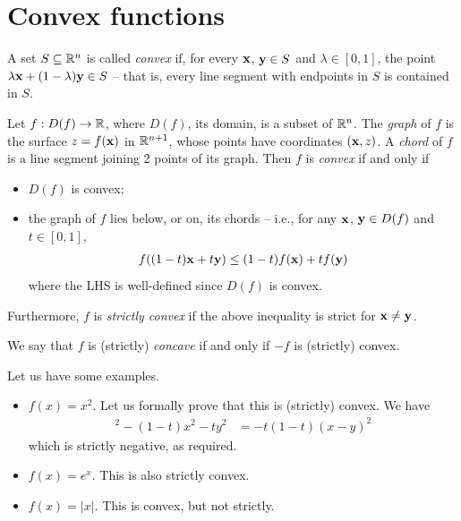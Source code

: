 \documentclass{../../template/note}
\begin{document}
    \section{Convex functions}
    
    \begin{definition}
        A set $S \subseteq \mathbb R^n$ is called \emph{convex} if, for every $\V x$, $\V y \in S$ and $\lambda \in [0, 1]$, the point $\lambda \V x + (1-\lambda)\V y \in S$ -- that is, every line segment with endpoints in $S$ is contained in $S$.
    \end{definition}
    
    \begin{definition}
        Let $f: D(f) \to \mathbb R$, where $D(f)$, its domain, is a subset of $\mathbb R^n$. The \emph{graph} of $f$ is the surface $z = f(\V x)$ in $\mathbb R^{n+1}$, whose points have coordinates $(\V x, z)$. A \emph{chord} of $f$ is a line segment joining 2 points of its graph. Then $f$ is \emph{convex} if and only if
        \begin{itemize}
            \item $D(f)$ is convex;
            \item the graph of $f$ lies below, or on, its chords -- i.e., for any $\V x$, $\V y \in D(f)$ and $t \in [0, 1]$,
            \begin{align*}
                f((1-t)\V x + t\V y) \leq (1-t)f(\V x) + tf(\V y)
            \end{align*}
            where the LHS is well-defined since $D(f)$ is convex.            
        \end{itemize}
        Furthermore, $f$ is \emph{strictly convex} if the above inequality is strict for $\V x \neq \V y$.
    \end{definition}
    
    \begin{definition}[Concavity]
        We say that $f$ is (strictly) \emph{concave} if and only if $-f$ is (strictly) convex.
    \end{definition}
    
    \begin{example*}
        Let us have some examples.
        \begin{itemize}
            \item $f(x) = x^2$. Let us formally prove that this is (strictly) convex. We have
            \begin{align*}
                [(1-t)x + ty]^2 - (1-t)x^2 - ty^2 &= -t(1-t)(x-y)^2
            \end{align*}
            which is strictly negative, as required.
            \item $f(x) = e^x$. This is also strictly convex.
            \item $f(x) = |x|$. This is convex, but not strictly.
        \end{itemize}
    \end{example*}
    
\end{document}
